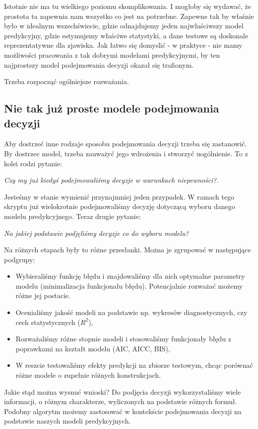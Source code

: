\documentclass[10pt,a4paper]{book}
\begin{document}
Istotnie nie ma tu wielkiego poziomu skomplikowania. I mogłoby się wydawać, że prostota ta zapewnia nam wszystko co jest na potrzebne. Zapewne tak by właśnie było w idealnym wszechświecie, gdzie odnajdujemy jeden najwłaściwszy model predykcyjny, gdzie estymujemy właściwe statystyki, a dane testowe są doskonale reprezentatywne dla zjawiska. Jak łatwo się domyslić - w praktyce - nie mamy możliwości pracowania z tak dobrymi modelami predykcyjnymi, by ten najprostszy model podejmowania decyzji okazał się trafionym.

Trzeba rozpocząć ogólniejsze rozważania.

\subsection{Nie tak już proste modele podejmowania decyzji} 

Aby dostrzeć inne rodzaje sposobu podejmowania decyzji trzeba się zastanowić. By dostrzec model, trzeba zauważyć jego wdrożenia i stworzyć uogólnienie. To z kolei rodzi pytanie:

\textit{Czy my już kiedyś podejmowaliśmy decyzje w warunkach niepewności?.}

Jesteśmy w stanie wymienić przynajmniej jeden przypadek. W ramach tego skryptu już wielokrotnie podejmowaliśmy decyzję dotyczącą wyboru danego modelu predykcyjnego. Teraz drugie pytanie:

\textit{Na jakiej podstawie podjęliśmy decyzje co do wyboru modelu?}

Na różnych etapach były to różne przesłanki. Można je zgrupować w następujące podgrupy:

\begin{itemize}
\item Wybieraliśmy funkcję błędu i znajdowaliśmy dla nich optymalne parametry modelu (minimalizacja funkcjonału błędu). Potencjalnie rozważać możemy różne jej postacie.
\item Ocenialiśmy jakość modeli na podstawie np. wykresów diagnostycznych, czy cech statystycznych ($R^2$),
\item Rozważaliśmy różne stopnie modeli i stosowaliśmy funkcjonały błędu z poprawkami na kształt modelu (AIC, AICC, BIS),
\item W reszcie testowaliśmy efekty predykcji na zbiorze testowym, chcąc porównać różne modele o zupełnie różnych konstrukcjach.
\end{itemize}

Jakie stąd można wysnuć wnioski? Do podjęcia decyzji wykorzystaliśmy wiele informacji, o różnym charakterze, wyliczonych na podstawie różnych formuł. Podobny algorytm możemy zastosować w kontekście podejmowania decyzji na podstawie naszych modeli predykcyjnych. 
\end{document}

